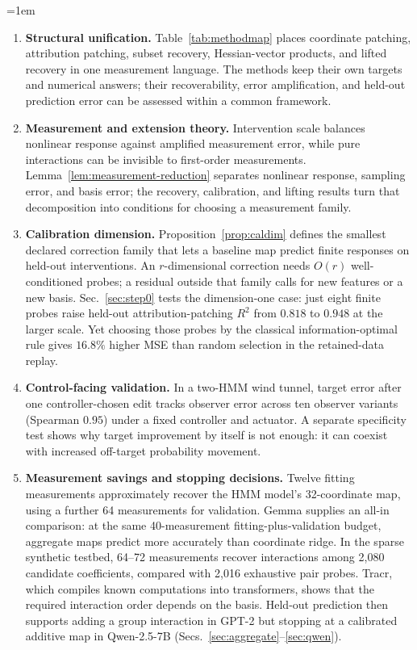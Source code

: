 \documentclass[sigconf,10pt,nonacm,balance=false]{acmart}
\begin{document}
\begingroup
\emergencystretch=1em
\begin{enumerate}[leftmargin=*,itemsep=2pt]
    \item \textbf{Structural unification.} Table~\ref{tab:methodmap} places coordinate patching, attribution patching, subset recovery, Hessian-vector products, and lifted recovery in one measurement language. The methods keep their own targets and numerical answers; their recoverability, error amplification, and held-out prediction error can be assessed within a common framework.
    \item \textbf{Measurement and extension theory.} Intervention scale balances nonlinear response against amplified measurement error, while pure interactions can be invisible to first-order measurements. Lemma~\ref{lem:measurement-reduction} separates nonlinear response, sampling error, and basis error; the recovery, calibration, and lifting results turn that decomposition into conditions for choosing a measurement family.
    \item \textbf{Calibration dimension.} Proposition~\ref{prop:caldim} defines the smallest declared correction family that lets a baseline map predict finite responses on held-out interventions. An $r$-dimensional correction needs $O(r)$ well-conditioned probes; a residual outside that family calls for new features or a new basis. Sec.~\ref{sec:step0} tests the dimension-one case: just eight finite probes raise held-out attribution-patching $R^2$ from $0.818$ to $0.948$ at the larger scale. Yet choosing those probes by the classical information-optimal rule gives $16.8\%$ higher MSE than random selection in the retained-data replay.
    \item \textbf{Control-facing validation.} In a two-HMM wind tunnel, target error after one controller-chosen edit tracks observer error across ten observer variants (Spearman $0.95$) under a fixed controller and actuator. A separate specificity test shows why target improvement by itself is not enough: it can coexist with increased off-target probability movement.
    \item \textbf{Measurement savings and stopping decisions.} Twelve fitting measurements approximately recover the HMM model's 32-coordinate map, using a further 64 measurements for validation. Gemma supplies an all-in comparison: at the same 40-measurement fitting-plus-validation budget, aggregate maps predict more accurately than coordinate ridge. In the sparse synthetic testbed, 64--72 measurements recover interactions among 2,080 candidate coefficients, compared with 2,016 exhaustive pair probes. Tracr, which compiles known computations into transformers, shows that the required interaction order depends on the basis. Held-out prediction then supports adding a group interaction in GPT-2 but stopping at a calibrated additive map in Qwen-2.5-7B (Secs.~\ref{sec:aggregate}--\ref{sec:qwen}).
\end{enumerate}
\endgroup
\end{document}

